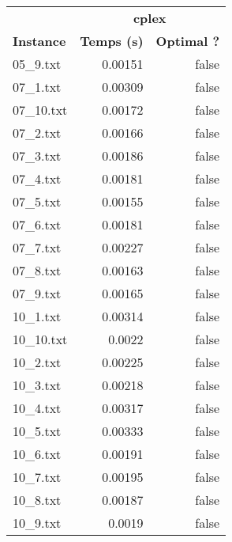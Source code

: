 \documentclass{article}
\begin{document}
\newpage
\begin{center}
\renewcommand{\arraystretch}{1.4} 
 \begin{tabular}{lrr}
	\hline
 & \multicolumn{2}{c}{\textbf{cplex}}\\
\textbf{Instance}  & \textbf{Temps (s)} & \textbf{Optimal ?} \\\hline

05\_9.txt & 0.00151 & false
\\
07\_1.txt & 0.00309 & false
\\
07\_10.txt & 0.00172 & false
\\
07\_2.txt & 0.00166 & false
\\
07\_3.txt & 0.00186 & false
\\
07\_4.txt & 0.00181 & false
\\
07\_5.txt & 0.00155 & false
\\
07\_6.txt & 0.00181 & false
\\
07\_7.txt & 0.00227 & false
\\
07\_8.txt & 0.00163 & false
\\
07\_9.txt & 0.00165 & false
\\
10\_1.txt & 0.00314 & false
\\
10\_10.txt & 0.0022 & false
\\
10\_2.txt & 0.00225 & false
\\
10\_3.txt & 0.00218 & false
\\
10\_4.txt & 0.00317 & false
\\
10\_5.txt & 0.00333 & false
\\
10\_6.txt & 0.00191 & false
\\
10\_7.txt & 0.00195 & false
\\
10\_8.txt & 0.00187 & false
\\
10\_9.txt & 0.0019 & false
\\
\hline\end{tabular}
\end{center}
\end{document}
